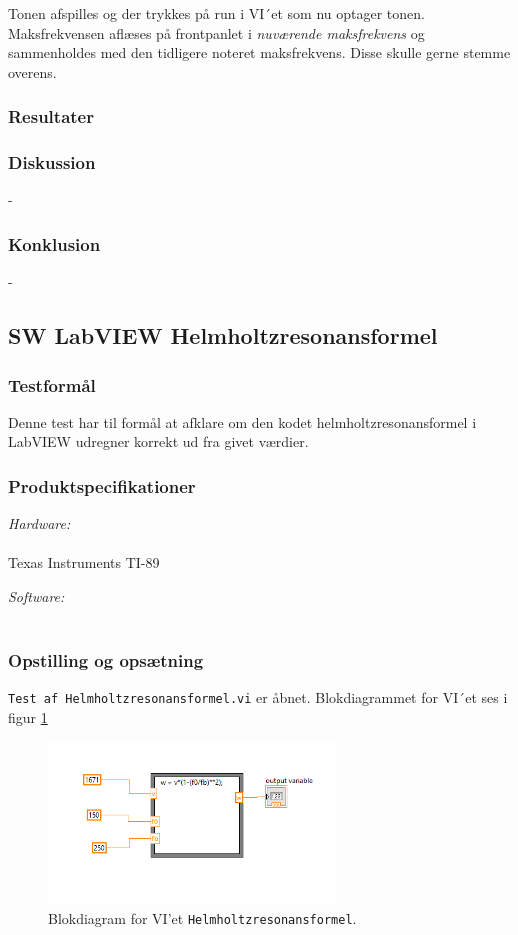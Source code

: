 {			 
			 Tonen afspilles og der trykkes på run i VI´et som nu optager tonen. 
		  Maksfrekvensen aflæses på frontpanlet i \textit{nuværende maksfrekvens} og sammenholdes med den tidligere noteret maksfrekvens. Disse skulle gerne stemme overens. 
			
			
		\subsubsection{Resultater}
		
		
	
		\subsubsection{Diskussion} 
	-
	
	
		\subsubsection{Konklusion}
		 
	- 

\subsection{SW LabVIEW Helmholtzresonansformel}	
\subsubsection{Testformål}
		Denne test har til formål at afklare om den kodet helmholtzresonansformel i LabVIEW udregner korrekt ud fra givet værdier. 
		\subsubsection{Produktspecifikationer}
	
		\textit{Hardware:}\\
		\PC\\
		Texas Instruments TI-89
	
		\textit{Software:}\\
		\labview\\
	
		\subsubsection{Opstilling og opsætning}
		\texttt{Test af Helmholtzresonansformel.vi} er åbnet. Blokdiagrammet for VI´et ses i figur \ref{fig:HHRF} 
		
		\begin{figure}
			\centering
			\includegraphics[width=3in]{HelmholtzformelLabVIEW}
			\caption{Blokdiagram for VI'et \texttt{Helmholtzresonansformel}.}
			\label{fig:HHRF}
		\end{figure}
	
}
